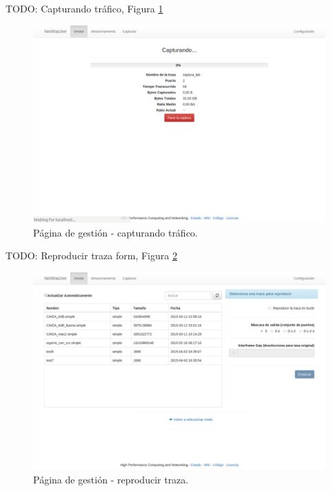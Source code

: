 TODO: Capturando tráfico, Figura \ref{fig:captura:gestioncapturando}
\begin{figure}[H]
  \centering
  \includegraphics[width=\textwidth,clip=true]{graphics/capturas/gestor_capturando}
  \caption{Página de gestión - capturando tráfico.}
  \label{fig:captura:gestioncapturando}
\end{figure}

TODO: Reproducir traza form, Figura \ref{fig:captura:gestionreproducir}
\begin{figure}[H]
  \centering
  \includegraphics[width=\textwidth,clip=true]{graphics/capturas/gestor_reproducir}
  \caption{Página de gestión - reproducir \gls{traza}.}
  \label{fig:captura:gestionreproducir}
\end{figure}

